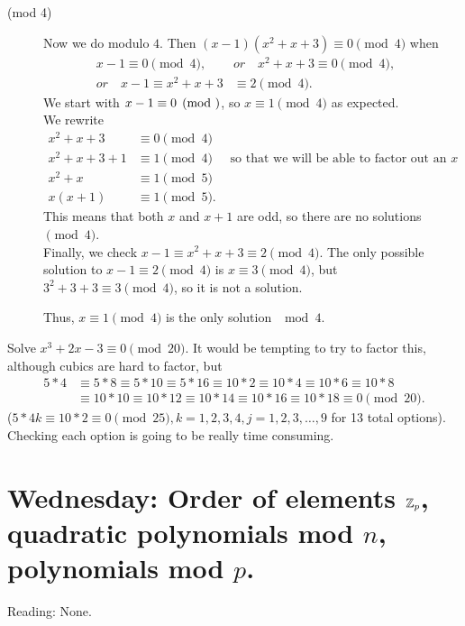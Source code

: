\documentclass[letterpaper, 11 pt]{article}
\begin{document}
\begin{example}
\begin{description}
\item[(mod 4)] 
 Now we do  modulo $4$. Then $(x-1)(x^2+x+3)\equiv 0 \pmod 4$ when  
 \begin{align*}
 x-1\equiv 0 \pmod 4, \quad &or \quad
 x^2+x+3\equiv 0\pmod 4,\quad \\or \quad 
 x-1\equiv x^2+x+3&\equiv 2\pmod 4. \end{align*}
 We start with $x-1\equiv 0 \pmod $, so $x\equiv 1 \pmod 4$ as expected. \\
 We rewrite \begin{align*}
x^2+x+3&\equiv 0 \pmod 4\\
 x^2+x+3+1&\equiv 1 \pmod 4 &\textrm{ so that we will be able to factor out an $x$}\\
 x^2+x&\equiv 1 \pmod 5\\
 x(x+1)&\equiv 1 \pmod 5.
\end{align*}
 This means that both $x$ and $x+1$ are odd, so there are no solutions $\pmod 4$.\\
Finally, we check $x-1\equiv x^2+x+3\equiv 2\pmod 4$. The only possible solution to $x-1\equiv 2\pmod 4$ is $x\equiv 3 \pmod 4$, but $3^2+3+3\equiv 3 \pmod 4$, so it is not a solution.

Thus, $x\equiv 1\pmod 4$ is the only solution $\mod 4$.
\end{description}
\end{example}

\begin{example}
Solve $x^3+2x-3\equiv 0 \pmod{20}$. It would be tempting to try to factor this, although cubics are hard to factor, but 
\begin{align*}5*4&\equiv 5*8\equiv 5*10\equiv 5*16\equiv 10*2\equiv 10*4\equiv 10*6\equiv 10*8\\&\equiv 10*10\equiv 10*12\equiv10*14\equiv10*16\equiv10*18\equiv 0 \pmod{20}.
 \end{align*}
 ($5*4k\equiv 10*2\equiv 0\pmod{25}, k=1,2,3,4, j=1,2,3,\dots,9$ for 13 total options).
Checking each option is going to be really time consuming. 
\end{example}

\section{Wednesday: Order of elements $\mathbb Z_p$, quadratic polynomials mod $n$, polynomials mod $p$.}
Reading: None.
\end{document}

